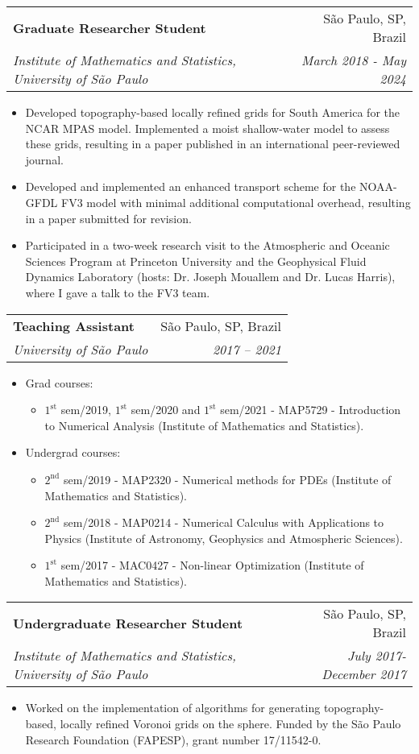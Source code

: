 \documentclass[letterpaper,11pt]{article}
\makeatletter
\newcommand{\resumeItem}[1]{
  \item\small{
    {#1 \vspace{-2pt}}
  }
}
\newcommand{\resumeSubheading}[4]{
  \vspace{-2pt}\item
    \begin{tabular*}{0.97\textwidth}[t]{l@{\extracolsep{\fill}}r}
      \textbf{#1} & #2 \\
      \textit{\small#3} & \textit{\small #4} \\
    \end{tabular*}\vspace{-7pt}
}
\newcommand{\resumeItemListStart}{\begin{itemize}}
\newcommand{\resumeItemListEnd}{\end{itemize}\vspace{-5pt}}
\makeatother
\begin{document}
\resumeSubheading
{Graduate Researcher Student}{São Paulo, SP, Brazil}
{Institute of Mathematics and Statistics, University of São Paulo }
{March 2018 - May 2024}  
\resumeItemListStart
\resumeItem{Developed topography-based locally refined grids for South America for the NCAR MPAS model. Implemented a moist shallow-water model to assess these grids, resulting in a paper published in an international peer-reviewed journal.}
\resumeItem{Developed and implemented an enhanced transport scheme for the NOAA-GFDL FV3 model with minimal additional computational overhead, resulting in a paper submitted for revision.}
\resumeItem{Participated in a two-week research visit to the Atmospheric and Oceanic Sciences Program at Princeton University and the Geophysical Fluid Dynamics Laboratory (hosts: Dr. Joseph Mouallem and Dr. Lucas Harris), where I gave a talk to the FV3 team.}
\resumeItemListEnd



\resumeSubheading
{Teaching Assistant}{São Paulo, SP, Brazil}
{University of São Paulo}{2017 -- 2021}
\resumeItemListStart
\resumeItem{Grad courses:}   
\begin{itemize}[label=\textendash]
	\item $1^{\textrm{st}}$ sem/2019, $1^{\textrm{st}}$ sem/2020 and $1^{\textrm{st}}$ sem/2021 - MAP5729 - Introduction to Numerical Analysis (Institute of Mathematics and Statistics).
\end{itemize} 
\resumeItem{Undergrad courses:}   
\begin{itemize}[label=\textendash]
	\item $2^{\textrm{nd}}$ sem/2019 - MAP2320 - Numerical methods for PDEs (Institute of Mathematics and Statistics).
	\item {$2^{\textrm{nd}}$ sem/2018 - MAP0214 - Numerical Calculus with Applications to Physics (Institute of Astronomy, Geophysics and Atmospheric Sciences).}        
	\item{$1^{\textrm{st}}$ sem/2017 - MAC0427 - Non-linear Optimization (Institute of Mathematics and Statistics).} 
\end{itemize}       
\resumeItemListEnd

\resumeSubheading
{Undergraduate Researcher Student}{São Paulo, SP, Brazil}
{Institute of Mathematics and Statistics, University of São Paulo }{July 2017- December 2017}
\resumeItemListStart
\resumeItem{Worked on the implementation of algorithms for generating topography-based, locally refined Voronoi grids on the sphere. Funded by the São Paulo Research Foundation (FAPESP), grant number 17/11542-0.}        
\resumeItemListEnd
\end{document}
